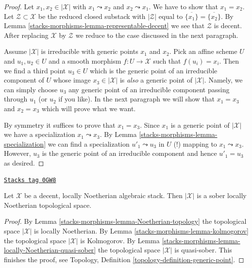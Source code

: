 \begin{proof}
Let $x_1, x_2 \in |\mathcal{X}|$ with $x_1 \leadsto x_2$ and
$x_2 \leadsto x_1$. We have to show that $x_1 = x_2$.
Let $\mathcal{Z} \subset \mathcal{X}$ be the reduced closed
substack with $|\mathcal{Z}|$ equal to
$\overline{\{x_1\}} = \overline{\{x_2\}}$.
By Lemma \ref{stacks-morphisms-lemma-representable-decent}
we see that $\mathcal{Z}$ is decent.
After replacing $\mathcal{X}$ by $\mathcal{Z}$ we reduce to
the case discussed in the next paragraph.

\medskip\noindent
Assume $|\mathcal{X}|$ is irreducible with generic points
$x_1$ and $x_2$. Pick an affine scheme $U$ and $u_1, u_2 \in U$
and a smooth morphism $f : U \to \mathcal{X}$ such that
$f(u_i) = x_i$. Then we find a third point $u_3 \in U$
which is the generic point of an irreducible component of $U$
whose image $x_3 \in |\mathcal{X}|$ is {\it also} a
generic point of $|\mathcal{X}|$. Namely, we can simply
choose $u_3$ any generic point of an irreducible component
passing through $u_1$ (or $u_2$ if you like).
In the next paragraph we will show that $x_1 = x_3$ and $x_2 = x_3$
which will prove what we want.

\medskip\noindent
By symmetry it suffices to prove that $x_1 = x_3$. Since $x_1$
is a generic point of $|\mathcal{X}|$ we have a specialization
$x_1 \leadsto x_3$.
By Lemma \ref{stacks-morphisms-lemma-specialization} we can find a specialization
$u'_1 \leadsto u_3$ in $U$ (!) mapping to $x_1 \leadsto x_3$.
However, $u_3$ is the generic point of an irreducible component
and hence $u'_1 = u_3$ as desired.
\end{proof}

\begin{lemma}
\label{stacks-morphisms-lemma-decent-locally-noetherian-sober}
\href{https://stacks.math.columbia.edu/tag/0GW8}{\texttt{Stacks tag 0GW8}}

Let $\mathcal{X}$ be a decent, locally Noetherian algebraic stack.
Then $|\mathcal{X}|$ is a sober locally Noetherian topological space.
\end{lemma}

\begin{proof}
By Lemma \ref{stacks-morphisms-lemma-Noetherian-topology} the topological space $|\mathcal{X}|$
is locally Noetherian. By Lemma \ref{stacks-morphisms-lemma-kolmogorov} the topological space
$|\mathcal{X}|$ is Kolmogorov. By
Lemma \ref{stacks-morphisms-lemma-locally-Noetherian-quasi-sober} the topological space
$|\mathcal{X}|$ is quasi-sober. This finishes the proof, see
Topology, Definition \ref{topology-definition-generic-point}.
\end{proof}

